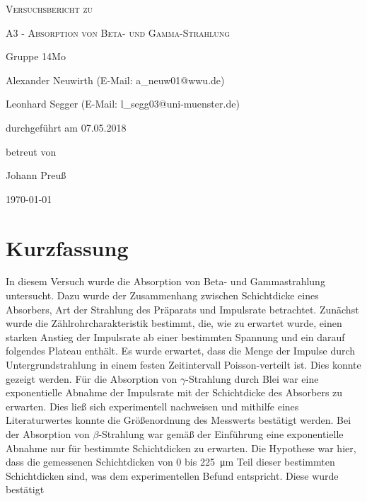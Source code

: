 \documentclass[
	a4paper,
	12pt,
	pagesize,
	ngerman
]{scrartcl}
\begin{document}
	
	\begin{titlepage}
		\centering
		{\scshape\LARGE Versuchsbericht zu \par}
		\vspace{1cm}
		{\scshape\huge A3 - Absorption von Beta- und Gamma-Strahlung \par}
		\vspace{2.5cm}
		{\LARGE Gruppe 14Mo \par}
		\vspace{0.5cm}
		
		{\large Alexander Neuwirth (E-Mail: a\_neuw01@wwu.de) \par}
		{\large Leonhard Segger (E-Mail: l\_segg03@uni-muenster.de) \par}
		\vfill
		
		durchgeführt am 07.05.2018\par
		betreut von\par
		{\large Johann Preuß}  
		
		\vfill
		
		{\large \today\par}
	\end{titlepage}
	\tableofcontents
	\newpage

	\section{Kurzfassung}
	In diesem Versuch wurde die Absorption von Beta- und Gammastrahlung untersucht. %
	Dazu wurde der Zusammenhang zwischen Schichtdicke eines Absorbers, Art der Strahlung des Präparats und Impulsrate betrachtet.
	Zunächst wurde die Zählrohrcharakteristik bestimmt, die, wie zu erwartet wurde, einen starken Anstieg der Impulsrate ab einer bestimmten Spannung und ein darauf folgendes Plateau enthält.
	Es wurde erwartet, dass die Menge der Impulse durch Untergrundstrahlung in einem festen Zeitintervall Poisson-verteilt ist.
	Dies konnte gezeigt werden.
	Für die Absorption von $\gamma$-Strahlung durch Blei war eine exponentielle Abnahme der Impulsrate mit der Schichtdicke des Absorbers zu erwarten.
	Dies ließ sich experimentell nachweisen und mithilfe eines Literaturwertes konnte die Größenordnung des Messwerts bestätigt werden.
	Bei der Absorption von $\beta$-Strahlung war gemäß der Einführung  eine exponentielle Abnahme nur für bestimmte Schichtdicken zu erwarten. \cite{Einfuehrung}
	Die Hypothese war hier, dass die gemessenen Schichtdicken von 0 bis \SI{225}{\micro \meter} Teil dieser bestimmten Schichtdicken sind, was dem experimentellen Befund entspricht.
	Diese wurde bestätigt
	
\end{document}
